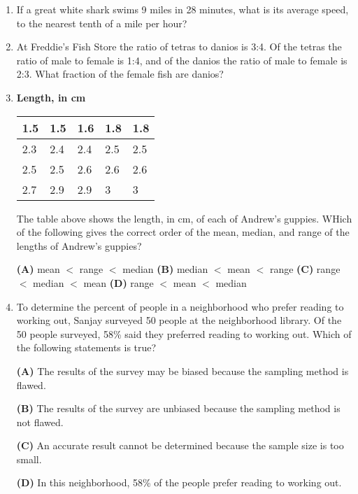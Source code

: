 \documentclass[../satmath.tex]{subfiles}
\begin{document}
\begin{enumerate}[label=\bfseries\arabic*.]
\item If a great white shark swims 9 miles in 28 minutes, what is its average speed, to the nearest tenth of a mile per hour?
 
\item At Freddie's Fish Store the ratio of tetras to danios is 3:4. Of the tetras the ratio of male to female is 1:4, and of the danios 
the ratio of male to female is 2:3. What fraction of the female fish are danios?
 
\item 
\begin{center}
    \textbf{Length, in cm}
\end{center}
\begin{table}[h]
    \centering
    \begin{tabular}{|l|l|l|l|l|}
    \hline
    1.5 & 1.5 & 1.6 & 1.8 & 1.8 \\ \hline
    2.3 & 2.4 & 2.4 & 2.5 & 2.5 \\ \hline
    2.5 & 2.5 & 2.6 & 2.6 & 2.6 \\ \hline
    2.7 & 2.9 & 2.9 & 3 & 3 \\ \hline
    \end{tabular}
\end{table}
The table above shows the length, in cm, of each of Andrew's guppies. WHich of the following gives the correct order of the mean, median, and range 
of the lengths of Andrew's guppies?

\textbf{(A) } mean $<$ range $<$ median \qquad \textbf{(B) } median $<$ mean $<$ range \qquad \textbf{(C) } range $<$ median $<$ mean \qquad \textbf{(D) } range $<$ mean $<$ median 

\item To determine the percent of people in a neighborhood who prefer reading to working out, Sanjay surveyed 50 people at the neighborhood library.
Of the 50 people surveyed, 58\% said they preferred reading to working out. Which of the following statements is true?

\textbf{(A) } The results of the survey may be biased because the sampling method is flawed.

\textbf{(B) } The results of the survey are unbiased because the sampling method is not flawed.

\textbf{(C) } An accurate result cannot be determined because the sample size is too small.

\textbf{(D) } In this neighborhood, 58\% of the people prefer reading to working out.


\end{enumerate}
\end{document}

